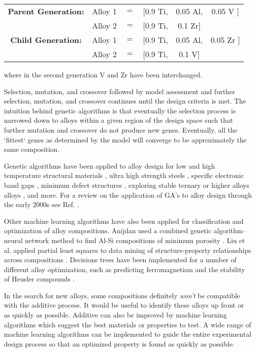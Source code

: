 \begin{table}[h!]
\begin{center}
\begin{tabular}{c|ccccc}
	\textbf{Parent Generation:} & Alloy 1 & $=$ & [0.9 Ti, & 0.05 Al, & 0.05 {\color{red} V} ]  \\
						 & Alloy 2 & $=$ & [0.9 Ti, & 0.1 {\color{green} Zr}] &              \\ \hline
 

	 \textbf{Child Generation:} & Alloy 1 & $=$ & [0.9 Ti, & 0.05 Al, & 0.05 {\color{green} Zr} ]  \\
						& Alloy 2 & $=$ & [0.9 Ti, & 0.1 {\color{red} V}] &              \\ 
\end{tabular}
\end{center}
\end{table}
where in the second generation V and Zr have been interchanged. 

Selection, mutation, and crossover followed by model assessment and further selection, mutation, and crossover continues until the design criteria is met. The intuition behind genetic algorithms is that eventually the selection process is narrowed down to alloys within a given region of the design space such that further mutation and crossover do not produce new genes. Eventually, all the `fittest` genes as determined by the model will converge to be approximately the same composition. 

Genetic algorithms have been applied to alloy design for low and high temperature structural materials \cite{Ikeda1997, Kulkarni2004}, ultra high strength steels \cite{Xu2008}, specific electronic band gaps \cite{Dudiy2006}, minimum defect structures \cite{Anijdan2006}, exploring stable ternary or higher alloys alloys \cite{Hautier2010, Johannesson2002}, and more. For a review on the application of GA's to alloy design through the early 2000s see Ref. \cite{Chakraborti2004}.

Other machine learning algorithms have also been applied for classification and optimization of alloy compositions. Anijdan used a combined genetic algorithm--neural network method to find Al-Si compositions of minimum porosity \cite{Anijdan2006}. Liu et al. applied partial least squares to data mining of structure-property relationships across compositions \cite{Liu2006}. Decisions trees have been implemented for a number of different alloy optimization, such as predicting ferromagnetism \cite{Landrum2003} and the stability of Heusler compounds \cite{Oliynyk2016}. 
 
In the search for new alloys, some compositions definitely \textit{won't} be compatible with the additive process. It would be useful to identify these alloys up front or as quickly as possible. Additive can also be improved by machine learning algorithms which suggest the best materials or properties to test. A wide range of machine learning algorithms can be implemented to guide the entire experimental design process so that an optimized property is found as quickly as possible. 